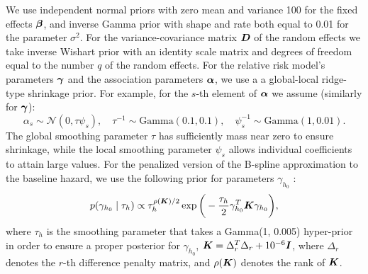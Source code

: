 We use independent normal priors with zero mean and variance 100 for the fixed effects $\boldsymbol{\beta}$, and inverse Gamma prior with shape and rate both equal to 0.01 for the parameter $\sigma^2$. For the variance-covariance matrix $\boldsymbol{D}$ of the random effects we take inverse Wishart prior with an identity scale matrix and degrees of freedom equal to the number $q$ of the random effects. For the relative risk model's parameters $\boldsymbol{\gamma}$ and the association parameters $\boldsymbol{\alpha}$, we use a a global-local ridge-type shrinkage prior. For example, for the $s$-{th} element of $\boldsymbol{\alpha}$ we assume (similarly for $\boldsymbol{\gamma}$):
\begin{equation*} 
\alpha_s \sim \mathcal{N}(0, \tau\psi_s), \quad \tau^{-1} \sim \mbox{Gamma}(0.1, 0.1),  \quad \psi_s^{-1} \sim \mbox{Gamma}(1, 0.01).
\end{equation*} 
The global smoothing parameter $\tau$ has sufficiently mass near zero to ensure shrinkage, while the local smoothing parameter $\psi_s$ allows individual coefficients to attain large values. For the penalized version of the B-spline approximation to the baseline hazard, we use the following prior for parameters $\gamma_{h_0}$ \citep{lang2004bayesian}:
\begin{equation*}
p(\gamma_{h_0} \mid \tau_h) \propto \tau_h^{\rho(\boldsymbol{K})/2} \exp\bigg(-\frac{\tau_h}{2}\gamma_{h_0}^T \boldsymbol{K} \gamma_{h_0}\bigg),
\end{equation*}
where $\tau_h$ is the smoothing parameter that takes a Gamma(1, 0.005) hyper-prior in order to ensure a proper posterior for $\gamma_{h_0}$, $\boldsymbol{K} = \Delta_r^T \Delta_r + 10^{-6} \boldsymbol{I}$, where $\Delta_r$ denotes the $r$-th difference penalty matrix, and $\rho(\boldsymbol{K})$ denotes the rank of $\boldsymbol{K}$.